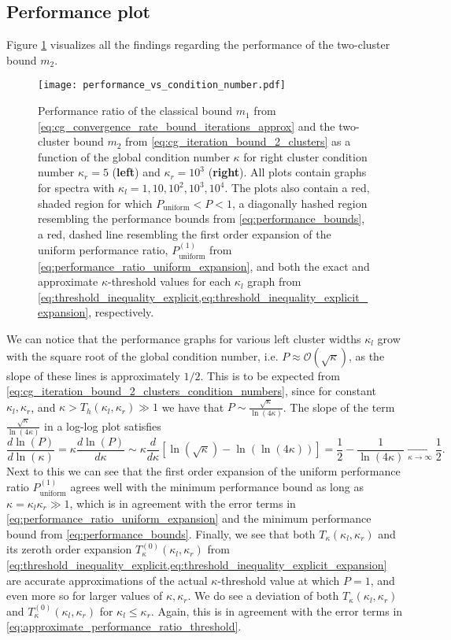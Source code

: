 \subsection{Performance plot}\label{sec:performance_plot}
Figure \ref{fig:two_cluster_bound_performance} visualizes all the findings regarding the performance of the two-cluster bound $m_2$.
\begin{figure}[H]
    \centering
    \texttt{[image: performance\_vs\_condition\_number.pdf]}
    \caption{Performance ratio of the classical bound $m_1$ from \cref{eq:cg_convergence_rate_bound_iterations_approx} and the two-cluster bound $m_2$ from \cref{eq:cg_iteration_bound_2_clusters} as a function of the global condition number $\kappa$ for right cluster condition number $\kappa_r = 5$ (\textbf{left}) and $\kappa_r = 10^3$ (\textbf{right}). All plots contain graphs for spectra with $\kappa_l = 1, 10, 10^2, 10^3, 10^4$. The plots also contain a red, shaded region for which $P_{\text{uniform}} < P < 1$, a diagonally hashed region resembling the performance bounds from \cref{eq:performance_bounds}, a red, dashed line resembling the first order expansion of the uniform performance ratio, $P^{(1)}_{\text{uniform}}$ from \cref{eq:performance_ratio_uniform_expansion}, and both the exact and approximate $\kappa$-threshold values for each $\kappa_l$ graph from \cref{eq:threshold_inequality_explicit,eq:threshold_inequality_explicit_expansion}, respectively.}
    \label{fig:two_cluster_bound_performance}
\end{figure}
We can notice that the performance graphs for various left cluster widths $\kappa_l$ grow with the square root of the global condition number, i.e. $P \approx \mathcal{O}(\sqrt{\kappa})$, as the slope of these lines is approximately $1/2$. This is to be expected from \cref{eq:cg_iteration_bound_2_clusters_condition_numbers}, since for constant $\kappa_l,\kappa_r$, and $\kappa > T_h(\kappa_l, \kappa_r) \gg 1$ we have that $P \sim \frac{\sqrt{\kappa}}{\ln(4\kappa)}$. The slope of the term $\frac{\sqrt{\kappa}}{\ln(4\kappa)}$ in a log-log plot satisfies
\[
    \frac{d\ln(P)}{d\ln(\kappa)} =\kappa\frac{d\ln(P)}{d\kappa} \sim \kappa\frac{d}{d\kappa} \left[\ln(\sqrt{\kappa}) - \ln(\ln(4\kappa))\right] = \frac{1}{2} - \frac{1}{\ln(4\kappa)} \underset{\kappa\to\infty}{\longrightarrow} \frac{1}{2}.
\]
Next to this we can see that the first order expansion of the uniform performance ratio $P^{(1)}_{\text{uniform}}$ agrees well with the minimum performance bound as long as $\kappa = \kappa_l\kappa_r \gg 1$, which is in agreement with the error terms in \cref{eq:performance_ratio_uniform_expansion} and the minimum performance bound from \cref{eq:performance_bounds}. Finally, we see that both $T_{\kappa}(\kappa_l, \kappa_r)$ and its zeroth order expansion $T^{(0)}_{\kappa}(\kappa_l, \kappa_r)$ from \cref{eq:threshold_inequality_explicit,eq:threshold_inequality_explicit_expansion} are accurate approximations of the actual $\kappa$-threshold value at which $P=1$, and even more so for larger values of $\kappa,\kappa_r$. We do see a deviation of both $T_{\kappa}(\kappa_l, \kappa_r)$ and $T^{(0)}_{\kappa}(\kappa_l, \kappa_r)$ for $\kappa_l\leq\kappa_r$. Again, this is in agreement with the error terms in \cref{eq:approximate_performance_ratio_threshold}.

